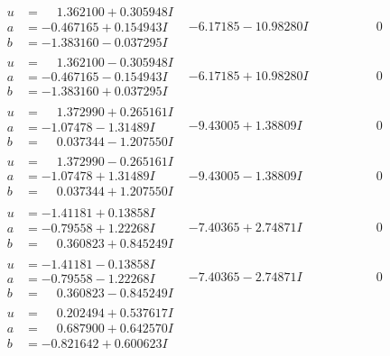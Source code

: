 \documentclass[1p]{elsarticle_modified}
\theoremstyle{definition}
\begin{document}
$$\begin{array}{c|c|c}
 \hline 
\begin{aligned}
u &= \phantom{-}1.362100 + 0.305948 I \\
a &= -0.467165 + 0.154943 I \\
b &= -1.383160 - 0.037295 I\end{aligned}
 & -6.17185 - 10.98280 I & \phantom{-0.000000 } 0 \\ \hline\begin{aligned}
u &= \phantom{-}1.362100 - 0.305948 I \\
a &= -0.467165 - 0.154943 I \\
b &= -1.383160 + 0.037295 I\end{aligned}
 & -6.17185 + 10.98280 I & \phantom{-0.000000 } 0 \\ \hline\begin{aligned}
u &= \phantom{-}1.372990 + 0.265161 I \\
a &= -1.07478 - 1.31489 I \\
b &= \phantom{-}0.037344 - 1.207550 I\end{aligned}
 & -9.43005 + 1.38809 I & \phantom{-0.000000 } 0 \\ \hline\begin{aligned}
u &= \phantom{-}1.372990 - 0.265161 I \\
a &= -1.07478 + 1.31489 I \\
b &= \phantom{-}0.037344 + 1.207550 I\end{aligned}
 & -9.43005 - 1.38809 I & \phantom{-0.000000 } 0 \\ \hline\begin{aligned}
u &= -1.41181 + 0.13858 I \\
a &= -0.79558 + 1.22268 I \\
b &= \phantom{-}0.360823 + 0.845249 I\end{aligned}
 & -7.40365 + 2.74871 I & \phantom{-0.000000 } 0 \\ \hline\begin{aligned}
u &= -1.41181 - 0.13858 I \\
a &= -0.79558 - 1.22268 I \\
b &= \phantom{-}0.360823 - 0.845249 I\end{aligned}
 & -7.40365 - 2.74871 I & \phantom{-0.000000 } 0 \\ \hline\begin{aligned}
u &= \phantom{-}0.202494 + 0.537617 I \\
a &= \phantom{-}0.687900 + 0.642570 I \\
b &= -0.821642 + 0.600623 I\end{aligned}

\end{array}$$
\end{document}
